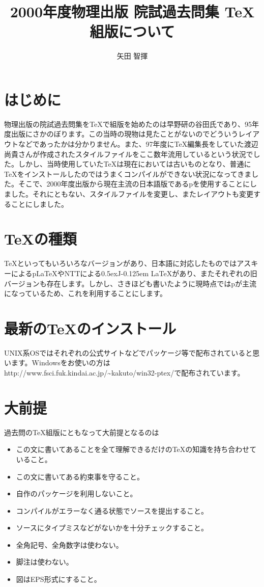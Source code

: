 \documentclass[a4j]{jarticle}
\title{2000年度物理出版 院試過去問集 TeX組版について}
\author{矢田 智揮}
\date{}
\def\jLaTeX{\lower0.5ex\hbox{J}\kern-0.125em \LaTeX}
\begin{document}
\maketitle

\section{はじめに}
物理出版の院試過去問集を\TeX で組版を始めたのは早野研の谷田氏であり、95年度出版にさかのぼります。この当時の現物は見たことがないのでどういうレイアウトなどであったかは分かりません。また、97年度に\TeX 編集長をしていた渡辺 尚貴さんが作成されたスタイルファイルをここ数年流用しているという状況でした。しかし、当時使用していた\TeX は現在においては古いものとなり、普通に\TeX をインストールしたのではうまくコンパイルができない状況になってきました。そこで、2000年度出版から現在主流の日本語版\LaTeXe であるp\LaTeXe を使用することにしました。それにともない、スタイルファイルを変更し、またレイアウトも変更することにしました。

\section{\TeX の種類}
\TeX といってもいろいろなバージョンがあり、日本語に対応したものではアスキーによるp\LaTeX やNTTによる\jLaTeX があり、またそれぞれの旧バージョンも存在します。しかし、さきほども書いたように現時点ではp\LaTeXe が主流になっているため、これを利用することにします。

\section{最新の\TeX のインストール}
UNIX系OSではそれぞれの公式サイトなどでパッケージ等で配布されていると思います。Windowsをお使いの方はhttp://www.fsci.fuk.kindai.ac.jp/\~{}kakuto/win32-ptex/で配布されています。


\section{大前提}
過去問の\TeX 組版にともなって大前提となるのは

\begin{itemize}
\item この文に書いてあることを全て理解できるだけの\TeX の知識を持ち合わせていること。
\item この文に書いてある約束事を守ること。
\item 自作のパッケージを利用しないこと。
\item コンパイルがエラーなく通る状態でソースを提出すること。
\item ソースにタイプミスなどがないかを十分チェックすること。
\item 全角記号、全角数字は使わない。
\item 脚注は使わない。
\item 図はEPS形式にすること。
\end{itemize}
\end{document}
